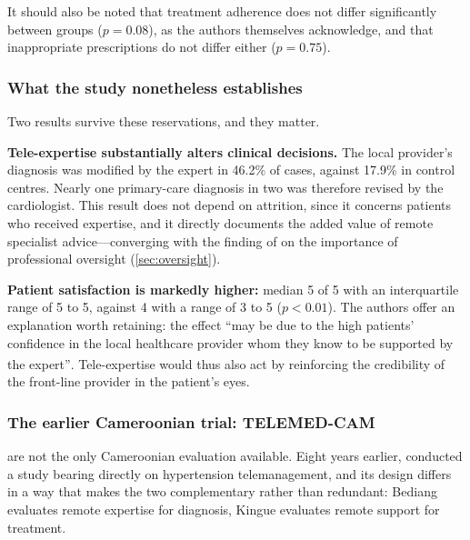 \documentclass[12pt,a4paper,oneside]{report}
\newcommand{\bq}[1]{``#1''\textsuperscript{\dag}}
\begin{document}
It should also be noted that treatment adherence does not differ significantly between groups ($p = 0.08$), as the authors themselves acknowledge, and that inappropriate prescriptions do not differ either ($p = 0.75$).

\subsubsection{What the study nonetheless establishes}

Two results survive these reservations, and they matter.

\textbf{Tele-expertise substantially alters clinical decisions.} The local provider's diagnosis was modified by the expert in 46.2\% of cases, against 17.9\% in control centres. Nearly one primary-care diagnosis in two was therefore revised by the cardiologist. This result does not depend on attrition, since it concerns patients who received expertise, and it directly documents the added value of remote specialist advice---converging with the finding of \textcite{mao2020} on the importance of professional oversight (\cref{sec:oversight}).

\textbf{Patient satisfaction is markedly higher:} median 5 of 5 with an interquartile range of 5 to 5, against 4 with a range of 3 to 5 ($p < 0.01$). The authors offer an explanation worth retaining: the effect \bq{may be due to the high patients' confidence in the local healthcare provider whom they know to be supported by the expert}. Tele-expertise would thus also act by reinforcing the credibility of the front-line provider in the patient's eyes.

\subsubsection{The earlier Cameroonian trial: TELEMED-CAM}\label{sec:telemedcam}

\Textcite{bediang2021} are not the only Cameroonian evaluation available. Eight years earlier, \textcite{kingue2013} conducted a study bearing directly on hypertension telemanagement, and its design differs in a way that makes the two complementary rather than redundant: Bediang evaluates remote expertise for diagnosis, Kingue evaluates remote support for treatment.
\end{document}
